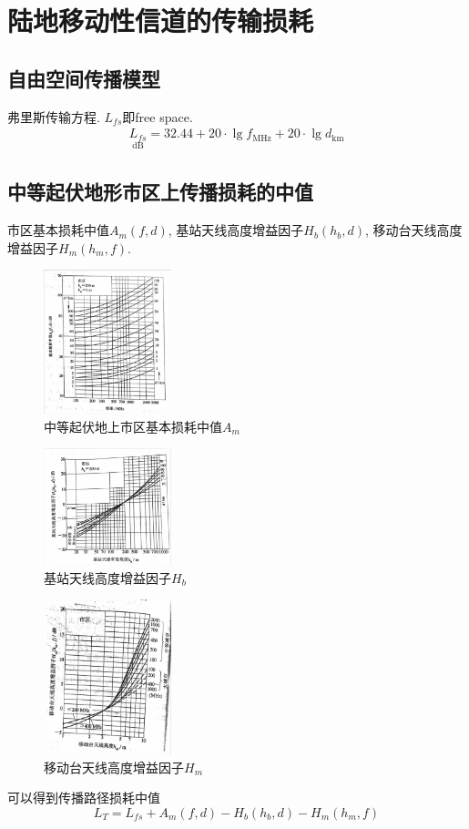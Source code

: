 \documentclass[a4paper]{report}
\begin{document}
 \section{陆地移动性信道的传输损耗}
 \subsection{自由空间传播模型}
 弗里斯传输方程. $L_{fs}$即free space. 
 \begin{align*}
	 \underset{\text{dB}}{L_{fs}}=32.44+20\cdot \lg {f_{\text{MHz}}}+20\cdot \lg {d_{\text{km}}}
 \end{align*}
 \subsection{中等起伏地形市区上传播损耗的中值}
 市区基本损耗中值$A_m(f,d)$, 基站天线高度增益因子$H_b(h_b,d)$, 移动台天线高度增益因子$H_m(h_m,f)$. 
 \begin{figure}[H]
 \centering
 \includegraphics[width=0.33\textwidth]{A_m.jpg}
 \caption{中等起伏地上市区基本损耗中值$A_m$}
 \end{figure}
 \begin{figure}[H]
 \centering
 \includegraphics[width=0.33\textwidth]{H_b.jpg}
 \caption{基站天线高度增益因子$H_b$}
 \end{figure}
 \begin{figure}[H]
 \centering
 \includegraphics[width=0.33\textwidth]{H_m.jpg}
 \caption{移动台天线高度增益因子$H_m$}
 \end{figure}
可以得到传播路径损耗中值
 \begin{equation}
	 L_T=L_{fs}+A_m(f,d)-H_b(h_b,d)-H_m(h_m, f)
 \end{equation}
\end{document}
